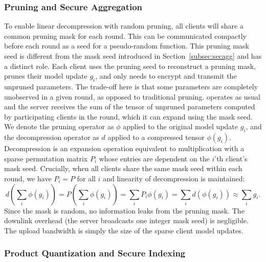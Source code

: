 \subsubsection{Pruning and Secure Aggregation}

To enable linear decompression with random pruning, all clients will share a common pruning mask for each round. 
This can be communicated compactly before each round as a seed for a pseudo-random function. 
This pruning mask seed is different from the \SecAgg mask seed introduced in Section~\ref{subsec:secagg} and has a distinct role.
Each client uses the pruning seed to reconstruct a pruning mask, prunes their model update $g_i$, and only needs to encrypt and transmit the unpruned parameters. 
The trade-off here is that some parameters are completely unobserved in a given round, as opposed to traditional pruning. 
\SecAgg operates as usual and the server receives the sum of the tensor of unpruned parameters computed by participating clients in the round, which it can expand using the mask seed.  
We denote the pruning operator as $\phi$ applied to the original model update $g_i$, and the decompression operator as $d$ applied to a compressed tensor $\phi(g_i)$. Decompression is an expansion operation equivalent to multiplication with a sparse permutation matrix $P_i$ whose entries are dependent on the $i$'th client's mask seed. 
Crucially, when all clients share the same mask seed within each round, we have $P_i = P$ for all $i$ and linearity of decompression is maintained:
\begin{equation*} \textstyle
    d \left(\sum_i \phi(g_i) \right) = P \left( \sum_i \phi(g_i) \right) = \sum_i P_i\phi(g_i) = \sum_i d(\phi(g_i)) \approx \sum_i g_i.
\end{equation*}
%
 Since the mask is random, no information leaks from the pruning mask. The downlink overhead (the server broadcasts one integer mask seed) is negligible. The upload bandwidth is simply the size of the sparse client model updates. 

\subsubsection{Product Quantization and Secure Indexing}

